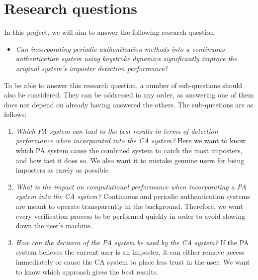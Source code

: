 \documentclass[informationsecurity]{gucmasterproject}
\begin{document}
\section{Research questions}
\label{research:questions}
In this project, we will aim to answer the following research question:
\begin{itemize}
    \item \textit{Can incorporating periodic authentication methods into a continuous authentication system using keystroke dynamics significantly improve the original system's imposter detection performance?}
\end{itemize}
To be able to answer this research question, a number of sub-questions should also be considered.
They can be addressed in any order, as answering one of them does not depend on already having answered the others.
The sub-questions are as follows:
\begin{enumerate}
\item \textit{Which PA system can lead to the best results in terms of detection performance when incorporated into the CA system?} Here we want to know which PA system cause the combined system to catch the most imposters, and how fast it does so. We also want it to mistake genuine users for being imposters as rarely as possible.
\item \textit{What is the impact on computational performance when incorporating a PA system into the CA system?} Continuous and periodic authentication systems are meant to operate transparently in the background. Therefore, we want every verification process to be performed quickly in order to avoid slowing down the user's machine.
\item \textit{How can the decision of the PA system be used by the CA system?} If the PA system believes the current user is an imposter, it can either remove access immediately or cause the CA system to place less trust in the user. We want to know which approach gives the best results.

\end{enumerate}
\end{document}
